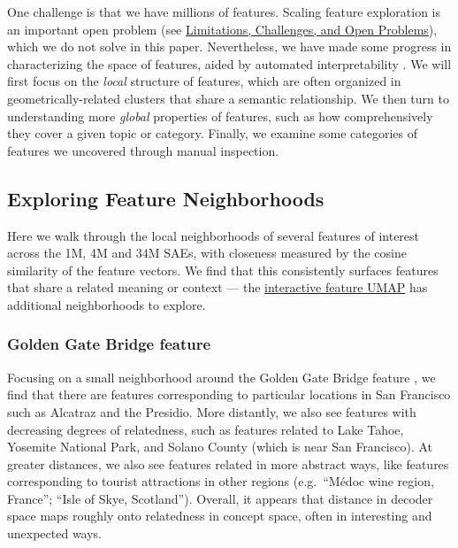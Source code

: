 \documentclass{article}
\let\oldsubsection\subsection
\renewcommand{\subsection}{\FloatBarrier\oldsubsection}
\newcommand{\featurechip}[2]{%
  \href{https://transformer-circuits.pub/2024/scaling-monosemanticity/features/index.html?featureId=#1_#2}{%
    \featurechipbox{\textcolor{white}{\textsf{\footnotesize #1/#2}}}%
  }%
}
\begin{document}
One challenge is that we have millions of features. Scaling feature exploration is an important open problem (see \hyperref[sec:discussion-limitations]{Limitations, Challenges, and Open Problems}), which we do not solve in this paper. Nevertheless, we have made some progress in characterizing the space of features, aided by automated interpretability \cite{bills2023language,bricken2023monosemanticity}. We will first focus on the \textit{local} structure of features, which are often organized in geometrically-related clusters that share a semantic relationship. We then turn to understanding more \textit{global} properties of features, such as how comprehensively they cover a given topic or category. Finally, we examine some categories of features we uncovered through manual inspection.

\subsection{Exploring Feature Neighborhoods}\label{sec:feature-survey-neighborhoods}

Here we walk through the local neighborhoods of several features of interest across the 1M, 4M and 34M SAEs, with closeness measured by the cosine similarity of the feature vectors. We find that this consistently surfaces features that share a related meaning or context --- the \href{https://transformer-circuits.pub/2024/scaling-monosemanticity/umap.html}{interactive feature UMAP} has additional neighborhoods to explore.

\subsubsection{Golden Gate Bridge feature}\label{sec:feature-survey-neighborhoods-golden}

Focusing on a small neighborhood around the Golden Gate Bridge feature \featurechip{34M}{31164353}, we find that there are features corresponding to particular locations in San Francisco such as Alcatraz and the Presidio. More distantly, we also see features with decreasing degrees of relatedness, such as features related to Lake Tahoe, Yosemite National Park, and Solano County (which is near San Francisco). At greater distances, we also see features related in more abstract ways, like features corresponding to tourist attractions in other regions (e.g.~“Médoc wine region, France”; “Isle of Skye, Scotland”). Overall, it appears that distance in decoder space maps roughly onto relatedness in concept space, often in interesting and unexpected ways.
\end{document}

